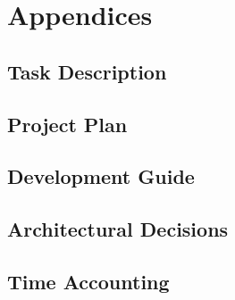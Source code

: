 




\listoffigures %

\listoftables %


\glsaddall
\printglossary




\appendix %
\chapter{Appendices}
\setcounter{secnumdepth}{3}
\renewcommand{\thechapter}{A}
\section{Task Description}\label{sec:task-description}

\section{Project Plan}\label{sec:project-plan}

\section{Development Guide}\label{sec:development-guide}

\section{Architectural Decisions}\label{sec:development-guide}

\section{Time Accounting}\label{sec:time-accounting}

